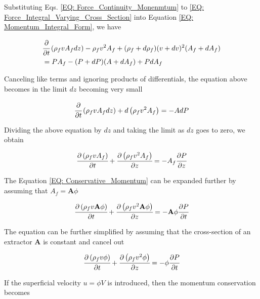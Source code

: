 \documentclass[../Article_Design_of_Experiment.tex]{subfiles}
\begin{document}
	Substituting Eqs. \ref{EQ: Force_Continuity_Monenmtum} to \ref{EQ: Force_Integral_Varying_Cross_Section} into Equation \ref{EQ: Momentum_Integral_Form}, we have
	
	{\footnotesize
		\begin{align}
			& \cfrac{\partial}{\partial t} \left( \rho_f v A_f dz \right) - \rho_f v^2 A_f + (\rho_f + d\rho_f)(v+dv)^2(A_f+dA_f)  \nonumber \\
			&= PA_f - (P+dP)(A+dA_f)+PdA_f
		\end{align}
	}
	
	Canceling like terms and ignoring products of differentials, the equation above becomes in the limit $dz$ becoming  very small
	
	{\footnotesize
		\begin{equation}
			\cfrac{\partial}{\partial t} \left( \rho_f v A_f dz \right) + d\left( \rho_f v^2 A_f \right) = -A dP
		\end{equation}
	}

	Dividing the above equation by $dz$ and taking the limit as $dz$ goes to zero, we obtain
	
	{\footnotesize
		\begin{equation}
			\cfrac{\partial \left( \rho_f v A_f \right)}{\partial t} + \cfrac{\partial \left( \rho_f v^2 A_f \right)}{\partial z} = -A_f \cfrac{\partial P}{\partial z}
			\label{EQ: Conservative_Momentum}
		\end{equation}
	}

	The Equation \ref{EQ: Conservative_Momentum} can be expanded further by assuming that $A_f = \textbf{A}\phi$ 
	
	{\footnotesize
		\begin{equation}
			\cfrac{\partial \left( \rho_f v \textbf{A} \phi \right) }{\partial t} + \cfrac{\partial \left( \rho_f v^2 \textbf{A} \phi \right) }{\partial z} = - 	\textbf{A} \phi \cfrac{\partial P}{\partial t}
		\end{equation}
	}

	The equation can be further simplified by assuming that the cross-section of an extractor $\textbf{A}$ is constant and cancel out
	
	{\footnotesize
		\begin{equation}
			\cfrac{\partial \left( \rho_f v \phi \right) }{\partial t} + \cfrac{\partial \left( \rho_f v^2 \phi \right) }{\partial z} = - \phi 	\cfrac{\partial P}{\partial t}
		\end{equation}
	}

	If the superficial velocity $u=\phi V$ is introduced, then the momentum conservation becomes
	
\end{document}
